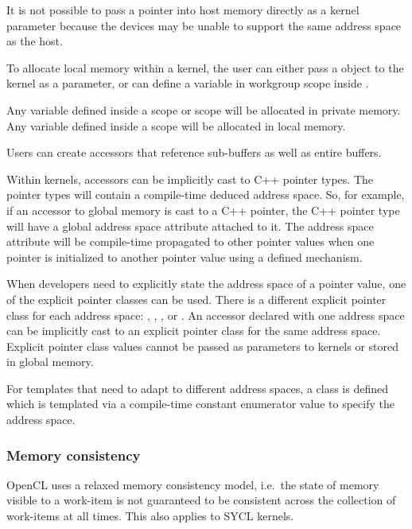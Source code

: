 It is not possible to pass a pointer into host memory directly as a kernel
parameter because the devices may be unable to support the same address space
as the host.

To allocate local memory within a kernel, the user can either pass
a  object to the kernel as a parameter, or
can define a variable in workgroup scope inside
.

Any variable defined inside a  scope or
 scope will be allocated in private
memory. Any variable defined inside a 
scope will be allocated in local memory.

Users can create accessors that reference sub-buffers as well as entire buffers.

Within kernels, accessors can be implicitly cast to C++ pointer types. The
pointer types will contain a compile-time deduced address space. So, for
example, if an accessor to global memory is cast to a C++ pointer, the C++
pointer type will have a global address space attribute attached to it. The
address space attribute will be compile-time propagated to other pointer
values when one pointer is initialized to another pointer value using a
defined mechanism.

When developers need to explicitly state the address space of a pointer value,
one of the explicit pointer classes can be used. There is a different explicit
pointer class for each address space: ,
, ,
or . An accessor declared with one
address space can be implicitly cast to an explicit pointer class
for the same address space. Explicit pointer class values cannot be passed
as parameters to kernels or stored in global memory.


For templates that need to adapt to different address spaces, a
 class is defined which is templated
via a compile-time constant enumerator value to specify the address space.

\subsubsection{Memory consistency}

OpenCL uses a relaxed memory consistency model, i.e.\ the state of
memory visible to a work-item is not guaranteed to be consistent
across the collection of work-items at all times. This also applies to
SYCL kernels.

